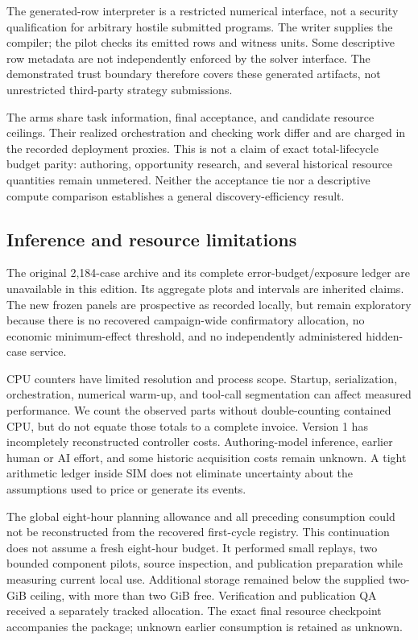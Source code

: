 The generated-row interpreter is a restricted numerical interface, not a
security qualification for arbitrary hostile submitted programs. The
writer supplies the compiler; the pilot checks its emitted rows and
witness units. Some descriptive row metadata are not independently
enforced by the solver interface. The demonstrated trust boundary
therefore covers these generated artifacts, not unrestricted third-party
strategy submissions.

The arms share task information, final acceptance, and candidate
resource ceilings. Their realized orchestration and checking work differ
and are charged in the recorded deployment proxies. This is not a claim
of exact total-lifecycle budget parity: authoring, opportunity research,
and several historical resource quantities remain unmetered. Neither the
acceptance tie nor a descriptive compute comparison establishes a
general discovery-efficiency result.

\subsection{Inference and resource
limitations}\label{inference-and-resource-limitations}

The original 2,184-case archive and its complete error-budget/exposure
ledger are unavailable in this edition. Its aggregate plots and
intervals are inherited claims. The new frozen panels are prospective as
recorded locally, but remain exploratory because there is no recovered
campaign-wide confirmatory allocation, no economic minimum-effect
threshold, and no independently administered hidden-case service.

CPU counters have limited resolution and process scope. Startup,
serialization, orchestration, numerical warm-up, and tool-call
segmentation can affect measured performance. We count the observed
parts without double-counting contained CPU, but do not equate those
totals to a complete invoice. Version 1 has incompletely reconstructed
controller costs. Authoring-model inference, earlier human or AI effort,
and some historic acquisition costs remain unknown. A tight arithmetic
ledger inside SIM does not eliminate uncertainty about the assumptions
used to price or generate its events.

The global eight-hour planning allowance and all preceding consumption
could not be reconstructed from the recovered first-cycle registry. This
continuation does not assume a fresh eight-hour budget. It performed
small replays, two bounded component pilots, source inspection, and
publication preparation while measuring current local use. Additional
storage remained below the supplied two-GiB ceiling, with more than two
GiB free. Verification and publication QA received a separately tracked
allocation. The exact final resource checkpoint accompanies the package;
unknown earlier consumption is retained as unknown.

